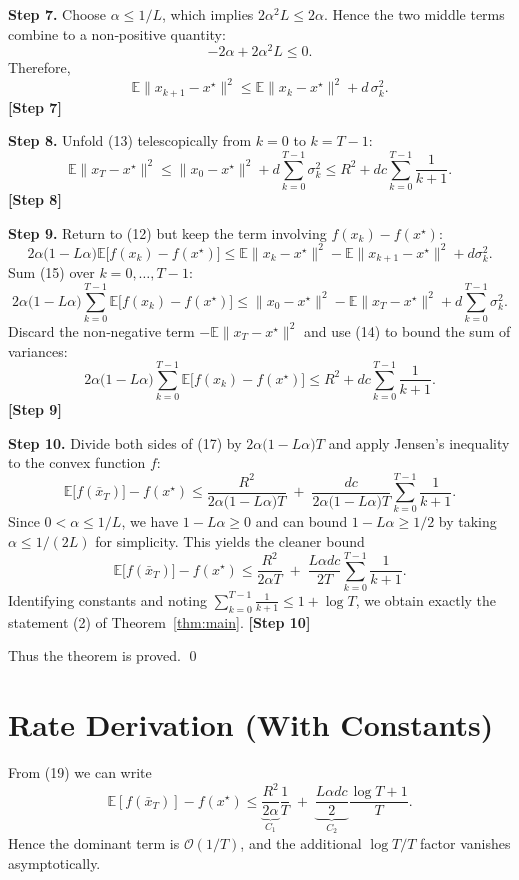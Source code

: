 \documentclass{article}
\newcommand{\E}{\mathbb{E}}
\begin{document}
\bigskip
\noindent\textbf{Step 7.}  Choose $\alpha\le 1/L$, which implies $2\alpha^{2}L\le 2\alpha$. Hence the two middle terms combine to a non‑positive quantity:
\[
-2\alpha+2\alpha^{2}L\le 0.
\]
Therefore,
\[
\E\|x_{k+1}-x^{\star}\|^{2}
\le \E\|x_{k}-x^{\star}\|^{2}+d\,\sigma_{k}^{2}.
\tag{13}
\]
\textbf{[Step 7]}

\bigskip
\noindent\textbf{Step 8.}  Unfold (13) telescopically from $k=0$ to $k=T-1$:
\[
\E\|x_{T}-x^{\star}\|^{2}
\le \|x_{0}-x^{\star}\|^{2}+d\sum_{k=0}^{T-1}\sigma_{k}^{2}
\le R^{2}+d c\sum_{k=0}^{T-1}\frac{1}{k+1}.
\tag{14}
\]
\textbf{[Step 8]}

\bigskip
\noindent\textbf{Step 9.}  Return to (12) but keep the term involving $f(x_{k})-f(x^{\star})$:
\[
2\alpha\bigl(1-L\alpha\bigr)\E\bigl[f(x_{k})-f(x^{\star})\bigr]
\le \E\|x_{k}-x^{\star}\|^{2}-\E\|x_{k+1}-x^{\star}\|^{2}+d\sigma_{k}^{2}.
\tag{15}
\]
Sum (15) over $k=0,\dots,T-1$:
\[
2\alpha\bigl(1-L\alpha\bigr)\sum_{k=0}^{T-1}\E\bigl[f(x_{k})-f(x^{\star})\bigr]
\le \|x_{0}-x^{\star}\|^{2}-\E\|x_{T}-x^{\star}\|^{2}
      +d\sum_{k=0}^{T-1}\sigma_{k}^{2}.
\tag{16}
\]
Discard the non‑negative term $-\E\|x_{T}-x^{\star}\|^{2}$ and use (14) to bound the sum of variances:
\[
2\alpha\bigl(1-L\alpha\bigr)\sum_{k=0}^{T-1}\E\bigl[f(x_{k})-f(x^{\star})\bigr]
\le R^{2}+d c\sum_{k=0}^{T-1}\frac{1}{k+1}.
\tag{17}
\]
\textbf{[Step 9]}

\bigskip
\noindent\textbf{Step 10.}  Divide both sides of (17) by $2\alpha\bigl(1-L\alpha\bigr)T$ and apply Jensen’s inequality to the convex function $f$:
\[
\E\bigl[f(\bar x_{T})\bigr]-f(x^{\star})
\le
\frac{R^{2}}{2\alpha\bigl(1-L\alpha\bigr)T}
\;+\;
\frac{d c}{2\alpha\bigl(1-L\alpha\bigr)T}
      \sum_{k=0}^{T-1}\frac{1}{k+1}.
\tag{18}
\]
Since $0<\alpha\le 1/L$, we have $1-L\alpha\ge 0$ and can bound $1-L\alpha\ge 1/2$ by taking $\alpha\le 1/(2L)$ for simplicity. This yields the cleaner bound
\[
\E\bigl[f(\bar x_{T})\bigr]-f(x^{\star})
\le
\frac{R^{2}}{2\alpha T}
\;+\;
\frac{L\alpha d c}{2T}\sum_{k=0}^{T-1}\frac{1}{k+1}.
\tag{19}
\]
Identifying constants and noting $\sum_{k=0}^{T-1}\frac{1}{k+1}\le 1+\log T$, we obtain exactly the statement (2) of Theorem~\ref{thm:main}.
\textbf{[Step 10]}

\bigskip
Thus the theorem is proved. \qed

\section*{Rate Derivation (With Constants)}
From (19) we can write
\[
\E[f(\bar x_{T})]-f(x^{\star})
\le
\underbrace{\frac{R^{2}}{2\alpha}}_{C_{1}}\frac{1}{T}
\;+\;
\underbrace{\frac{L\alpha d c}{2}}_{C_{2}}\frac{\log T+1}{T}.
\]
Hence the dominant term is $\mathcal O(1/T)$, and the additional $\log T/T$ factor vanishes asymptotically.
\end{document}
